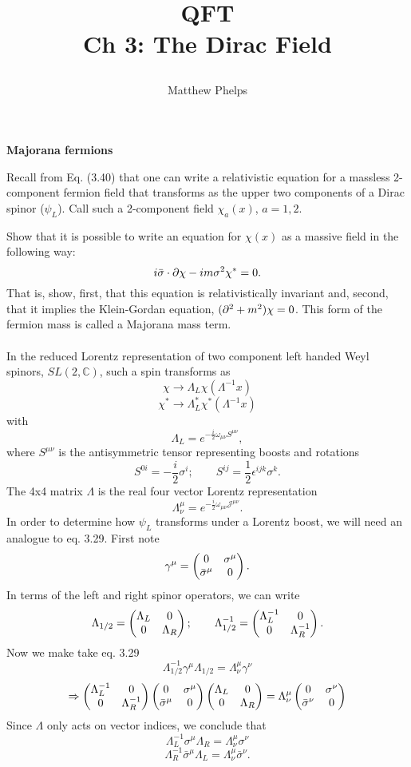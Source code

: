 \documentclass[10pt,letterpaper]{article}
\title{\begin{spacing}{1.3}QFT\\ Ch 3: The Dirac Field\end{spacing}}
\author{Matthew Phelps}
\date{}
\begin{document}
\maketitle

\benum
  	 \item[3.4]{\bf{Majorana fermions}}
	 
	Recall from Eq. (3.40) that one can write a relativistic equation for a massless 2-component fermion field that transforms
	as the upper two components of a Dirac spinor ($\psi_L$). Call such a 2-component field $\chi_a(x)$, $a=1,2$.
	\benum
	\item
	Show that it is possible to write an equation for $\chi(x)$ as a massive field in the following way:
	\[
		i\bar\sigma\cdot \partial\chi - im\sigma^2\chi^* = 0.
	\]
	That is, show, first, that this equation is relativistically invariant and, second, that it implies the Klein-Gordan
	equation, $(\partial^2+m^2)\chi = 0$. This form of the fermion mass is called a Majorana mass term.
	\\ \\
	In the reduced Lorentz representation of two component left handed Weyl spinors, $SL(2,\mathbb C)$, such a
	spin transforms as
	\[
		\chi \to \Lambda_{L}\chi(\Lambda^{-1}x)
	\]
	\[
		\chi^* \to \Lambda_{L}^*\chi^*(\Lambda^{-1}x)
	\]
	with
	\[
		\Lambda_{L} = e^{-\frac{i}{2}\omega_{\mu\nu}S^{\mu\nu}},
	\]
	 where $S^{\mu\nu}$ is the antisymmetric tensor representing boosts and rotations
	\[
		S^{0i} = -\frac{i}{2}\sigma^i;\qquad S^{ij} = \frac{1}{2}\epsilon^{ijk}\sigma^k.
	\]
	The 4x4 matrix $\Lambda$ is the real four vector Lorentz representation
	\[
		\Lambda^\mu_\nu = e^{-\frac{i}{2}\omega_{\mu\nu}\mathcal J^{\mu\nu}}.
	\]
	In order to determine how $\psi_L$ transforms under a Lorentz boost, we will need an analogue to eq. 3.29.
	First note
	\[
		\gamma^\mu = \begin{pmatrix} 0 &\sigma^\mu \\ \bar\sigma^\mu & 0 \end{pmatrix}.
	\]
	In terms of the left and right spinor operators, we can write
	\[
		\Lambda_{1/2} = \begin{pmatrix} \Lambda_L& 0\\0&\Lambda_R \end{pmatrix};\qquad 
		\Lambda^{-1}_{1/2} = \begin{pmatrix} \Lambda^{-1}_L& 0\\0&\Lambda^{-1}_R \end{pmatrix}.
	\]
	Now we make take eq. 3.29 
	\[
		\Lambda^{-1}_{1/2}\gamma^\mu\Lambda_{1/2} = \Lambda_\nu^\mu \gamma^\nu
	\]
	\[
		\Rightarrow
		\begin{pmatrix} \Lambda_L^{-1} & 0 \\0 & \Lambda_R^{-1} \end{pmatrix}
		\begin{pmatrix} 0 &\sigma^\mu \\ \bar\sigma^\mu & 0 \end{pmatrix}
		\begin{pmatrix} \Lambda_L& 0\\0&\Lambda_R \end{pmatrix}
		= \Lambda^\mu_\nu  \begin{pmatrix} 0 &\sigma^\nu \\ \bar\sigma^\nu & 0 \end{pmatrix}
	\]
	Since $\Lambda$ only acts on vector indices, we conclude that
	\[
		\Lambda^{-1}_L\sigma^\mu\Lambda_{R} = \Lambda_\nu^\mu \sigma^\nu
	\]
	\[
		\Lambda^{-1}_R\bar\sigma^\mu\Lambda_{L} = \Lambda_\nu^\mu \bar\sigma^\nu.
	\]
		
\end{document}
